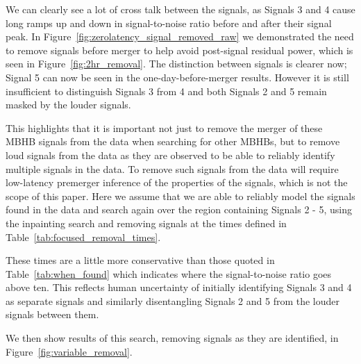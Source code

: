 We can clearly see a lot of cross talk between the signals, as Signals 3 and 4 cause long ramps up and down in signal-to-noise ratio before and after their signal peak.
In Figure~\ref{fig:zerolatency_signal_removed_raw} we demonstrated the need to remove signals before merger to help avoid post-signal residual power, which is seen in Figure~\ref{fig:2hr_removal}.
The distinction between signals is clearer now; Signal 5 can now be seen in the one-day-before-merger results.
However it is still insufficient to distinguish Signals 3 from 4 and both Signals 2 and 5 remain masked by the louder signals.

This highlights that it is important not just to remove the merger of these MBHB signals from the data when searching for other MBHBs, but to remove loud signals from the data as they are observed to be able to reliably identify multiple signals in the data.
To remove such signals from the data will require low-latency premerger inference of the properties of the signals, which is not the scope of this paper.
Here we assume that we are able to reliably model the signals found in the data and search again over the region containing Signals 2 - 5, using the inpainting search and removing signals at the times defined in Table~\ref{tab:focused_removal_times}.

\begin{table}

\caption{
    Times-before-merger at which we remove signals from the data in the focused region.
    Signal 4 is removed 14 days before merger, which corresponds to 10.9 days before Signal 3's merger.
    Signal 3 and 4 are removed 9.95 and 9.84 days before Signal 2 merges respectively.
    \label{tab:focused_removal_times}
}
\end{table}

These times are a little more conservative than those quoted in Table~\ref{tab:when_found} which indicates where the signal-to-noise ratio goes above ten.
This reflects human uncertainty of initially identifying Signals 3 and 4 as separate signals and similarly disentangling Signals 2 and 5 from the louder signals between them.

We then show results of this search, removing signals as they are identified, in Figure~\ref{fig:variable_removal}.

